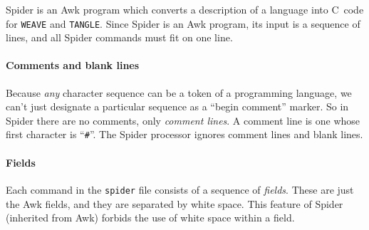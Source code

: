 {Spider} is an Awk program which converts a description of a
language into C~code for {\tt WEAVE} and {\tt TANGLE}.
Since {Spider} is an Awk program, its input is a sequence of
lines, and all {Spider} commands must fit on one line.

\paragraph{Comments and blank lines}
Because {\em any} character sequence can be a token of a programming
language, we can't just designate a particular sequence as a ``begin
comment'' marker.
So in {Spider} there are no comments, only {\em comment lines}.
A comment line is one whose first character is ``{\tt \#}''.
The {Spider} processor ignores comment lines and blank lines.

\paragraph{Fields}
Each command in the {\tt spider} file consists of a sequence of {\em
fields}.
These are just the Awk fields, and they are separated by white space.
This feature of {Spider} (inherited from Awk) forbids the use of
white space within a field.

